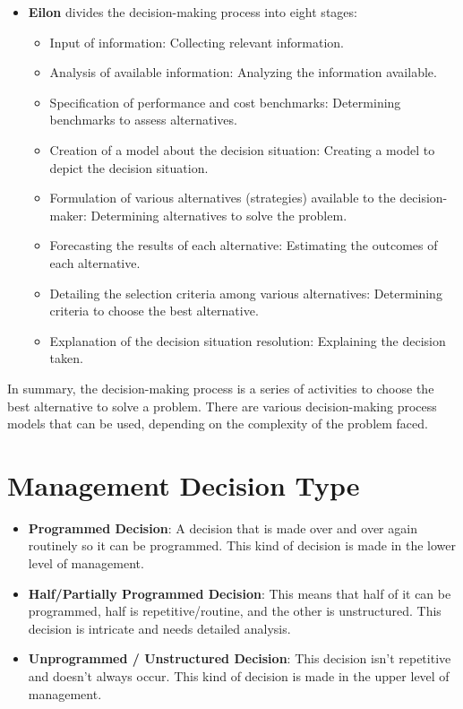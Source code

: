 \documentclass[12pt,titlepage]{article}
\begin{document}
\begin{itemize}
\begin{itemize}
    \end{itemize}
    \item \textbf{Eilon} divides the decision-making process into eight stages:
    \begin{itemize}
        \item Input of information: Collecting relevant information.
        \item Analysis of available information: Analyzing the information available.
        \item Specification of performance and cost benchmarks: Determining benchmarks to assess alternatives.
        \item Creation of a model about the decision situation: Creating a model to depict the decision situation.
        \item Formulation of various alternatives (strategies) available to the decision-maker: Determining alternatives to solve the problem.
        \item Forecasting the results of each alternative: Estimating the outcomes of each alternative.
        \item Detailing the selection criteria among various alternatives: Determining criteria to choose the best alternative.
        \item Explanation of the decision situation resolution: Explaining the decision taken.
    \end{itemize}
\end{itemize}
In summary, the decision-making process is a series of activities to choose the best alternative to solve a problem. There are various decision-making process models that can be used, depending on the complexity of the problem faced.
\newpage
\section{Management Decision Type}
\begin{itemize}
    \item \textbf{Programmed Decision}: A decision that is made over and over again routinely so it can be programmed. This kind of decision is made in the lower level of management.
    \item \textbf{Half/Partially Programmed Decision}: This means that half of it can be programmed, half is repetitive/routine, and the other is unstructured. This decision is intricate and needs detailed analysis.
    \item \textbf{Unprogrammed / Unstructured Decision}: This decision isn't repetitive and doesn't always occur. This kind of decision is made in the upper level of management.
\end{itemize}
\end{document}
